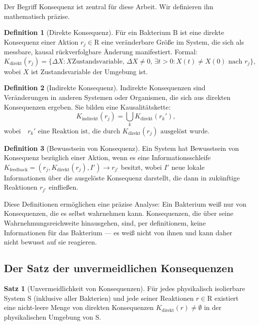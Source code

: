\documentclass[a4paper,12pt]{article}
\theoremstyle{definition}
\newtheorem{definition}{Definition}
\newtheorem{satz}{Satz}
\begin{document}
Der Begriff Konsequenz ist zentral für diese Arbeit. Wir definieren ihn mathematisch präzise.

\begin{definition}[Direkte Konsequenz]
Für ein Bakterium $\text{B}$ ist eine direkte Konsequenz einer Aktion $r_j \in \text{R}$ eine veränderbare Größe im System, die sich als messbare, kausal rückverfolgbare Änderung manifestiert. Formal:
\[
K_{\text{direkt}}(r_j) = \{\Delta X : X \text{Zustandsvariable}, \, \Delta X \neq 0, \, \exists t > 0: X(t) \neq X(0) \text{ nach } r_j\},
\]
wobei $X$ ist Zustandsvariable der Umgebung ist.
\end{definition}

\begin{definition}[Indirekte Konsequenz]
Indirekte Konsequenzen sind Veränderungen in anderen Systemen oder Organismen, die sich aus direkten Konsequenzen ergeben. Sie bilden eine Kausalitätskette:
\[
K_{\text{indirekt}}(r_j) = \bigcup_{k} K_{\text{direkt}}(r_k'),
\]
$\text{wobei} \quad r_k' \text{ eine Reaktion ist, die durch } K_{\text{direkt}}(r_j) \text{ ausgelöst wurde}$.
\end{definition}

\begin{definition}[Bewusstsein von Konsequenz]
Ein System hat Bewusstsein von Konsequenz bezüglich einer Aktion, wenn es eine Informationsschleife $K_{\text{feedback}} = (r_j, K_{\text{direkt}}(r_j), I') \to r_{j'}$ besitzt, wobei $I'$ neue lokale Informationen über die ausgelöste Konsequenz darstellt, die dann in zukünftige Reaktionen $r_{j'}$ einfließen.
\end{definition}

Diese Definitionen ermöglichen eine präzise Analyse: Ein Bakterium weiß nur von Konsequenzen, die es selbst wahrnehmen kann. Konsequenzen, die über seine Wahrnehmungsreichweite hinausgehen, sind, per definitionem, keine Informationen für das Bakterium --- es weiß nicht von ihnen und kann daher nicht bewusst auf sie reagieren.

\subsection{Der Satz der unvermeidlichen Konsequenzen}

\begin{satz}[Unvermeidlichkeit von Konsequenzen]
\label{satz:konsequenz_unvermeidlich}
Für jedes physikalisch isolierbare System $\text{S}$ (inklusive aller Bakterien) und jede seiner Reaktionen $r \in \text{R}$ existiert eine nicht-leere Menge von direkten Konsequenzen $K_{\text{direkt}}(r) \neq \emptyset$ in der physikalischen Umgebung von $\text{S}$.
\end{satz}
\end{document}
